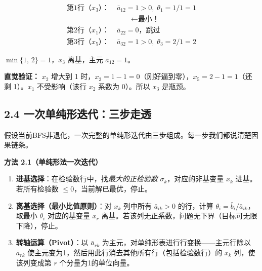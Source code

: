{\[
\begin{aligned}
\text{第1行（}x_3\text{）：}\; &\bar{a}_{12}=1 > 0,\;
\theta_1 = 1/1 = 1 \\
&\hspace{2em}\leftarrow \textbf{最小！} \\
\text{第2行（}x_1\text{）：}\; &\bar{a}_{22}=0 \text{，跳过} \\
\text{第3行（}x_5\text{）：}\; &\bar{a}_{32}=1 > 0,\;
\theta_3 = 2/1 = 2
\end{aligned}
\]

$\min\{1,\,2\} = 1$，$x_3$ 离基，主元 $\bar{a}_{12}=1$。

\textbf{直觉验证：} $x_2$ 增大到 1 时，$x_3 = 1-1=0$（刚好逼到零），$x_5 = 2-1=1$（还剩 1）。$x_1$ 不受影响（该行 $x_2$ 系数为 0）。所以 $x_3$ 是瓶颈。}

\medskip
{}

\subsection{2.4 一次单纯形迭代：三步走透}

假设当前BFS非退化，一次完整的单纯形迭代由三步组成。每一步我们都说清楚因果链条。

\begin{defbox}
\textbf{方法 2.1（单纯形法一次迭代）}

\begin{enumerate}
  \item \textbf{进基选择}：在检验数行中，找\emph{最大的正检验数} $\sigma_k$，对应的非基变量 $x_k$ 进基。若所有检验数 $\le 0$，当前解已最优，停止。
  \item \textbf{离基选择（最小比值原则）}：对 $x_k$ 列中所有 $\bar{a}_{ik} > 0$ 的行，计算 $\theta_i = \bar{b}_i / \bar{a}_{ik}$，取最小 $\theta_i$ 对应的基变量 $x_r$ 离基。若该列无正系数，问题无下界（目标可无限下降），停止。
  \item \textbf{转轴运算（Pivot）}：以 $\bar{a}_{rk}$ 为主元，对单纯形表进行行变换——主元行除以 $\bar{a}_{rk}$ 使主元变为1，然后用此行消去其他所有行（包括检验数行）的 $x_k$ 列，使该列变成第 $r$ 个分量为1的单位向量。
\end{enumerate}
\end{defbox}

